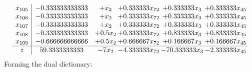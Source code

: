 \documentclass[11pt]{article}
\begin{document}
\[\begin{array}{c| c c@{\hskip 2pt} c@{\hskip 2pt} c@{\hskip 2pt} c@{\hskip 2pt} }
 x_{105}   &  -0.333333333333 & +  x_{2} & + 0.333333 x_{72} & + 0.333333 x_{3} & + 0.333333 x_{45}\\
 x_{106}   &  -0.333333333333 & +  x_{2} & + 0.333333 x_{72} & + 0.333333 x_{3} & + 0.333333 x_{45}\\
 x_{107}   &  -0.333333333333 & +  x_{2} & + 0.333333 x_{72} & + 0.333333 x_{3} & + 0.333333 x_{45}\\
 x_{108}   &  -0.333333333333 & + 0.5 x_{2} & + 0.333333 x_{72} & + 0.833333 x_{3} & + 0.833333 x_{45}\\
 x_{109}   &  -0.666666666666 & + 0.5 x_{2} & + 0.666667 x_{72} & + 0.166667 x_{3} & + 0.166667 x_{45}\\
\hline
z    &  59.3333333333 & -7 x_{2} & -4.333333 x_{72} & -70.333333 x_{3} & -2.333333 x_{45}\\
\end{array}\]
Forming the dual dictionary:
\end{document}
